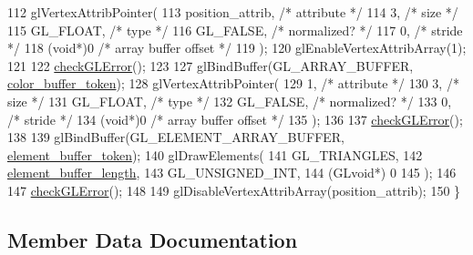 \begin{DoxyCode}
112   glVertexAttribPointer(
113                         position\_attrib,               \textcolor{comment}{/* attribute */}
114                         3,                             \textcolor{comment}{/* size */}
115                         GL\_FLOAT,                      \textcolor{comment}{/* type */}
116                         GL\_FALSE,                      \textcolor{comment}{/* normalized? */}
117                         0,                             \textcolor{comment}{/* stride */}
118                         (\textcolor{keywordtype}{void}*)0                       \textcolor{comment}{/* array buffer offset */}
119                         );
120   glEnableVertexAttribArray(1);
121 
122   \hyperlink{PyramidAsset_8cc_a75f201b0e53e68726854997957322b8d}{checkGLError}();
123 
127   glBindBuffer(GL\_ARRAY\_BUFFER, \hyperlink{classPyramidAsset_a7a984ee57fa7deda5aedf8b1f5f85c6f}{color\_buffer\_token});
128   glVertexAttribPointer(
129                         1,                             \textcolor{comment}{/* attribute */}
130                         3,                             \textcolor{comment}{/* size */}
131                         GL\_FLOAT,                      \textcolor{comment}{/* type */}
132                         GL\_FALSE,                      \textcolor{comment}{/* normalized? */}
133                         0,                             \textcolor{comment}{/* stride */}
134                         (\textcolor{keywordtype}{void}*)0                       \textcolor{comment}{/* array buffer offset */}
135                         );
136 
137   \hyperlink{PyramidAsset_8cc_a75f201b0e53e68726854997957322b8d}{checkGLError}();
138 
139   glBindBuffer(GL\_ELEMENT\_ARRAY\_BUFFER, \hyperlink{classPyramidAsset_a6f7e2f50904d2941e33df8eb7f5f9c2d}{element\_buffer\_token});
140   glDrawElements(
141                  GL\_TRIANGLES,
142                  \hyperlink{classPyramidAsset_a5566105859271b493eab3b5f9c02f866}{element\_buffer\_length},
143                  GL\_UNSIGNED\_INT,
144                  (GLvoid*) 0
145                  );
146 
147   \hyperlink{PyramidAsset_8cc_a75f201b0e53e68726854997957322b8d}{checkGLError}();
148 
149   glDisableVertexAttribArray(position\_attrib);
150 \}
\end{DoxyCode}


\subsection{Member Data Documentation}
\hypertarget{classPyramidAsset_ae576f67cdec51a52645131919d86a38a}{}
